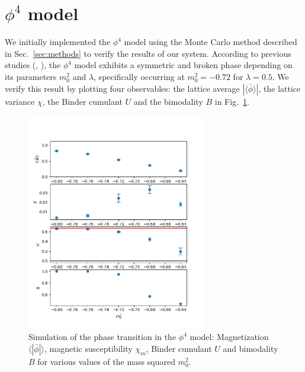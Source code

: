 \documentclass[12pt]{report}
\begin{document}
\section{$\phi^4$ model}

We initially implemented the $\phi^4$ model using the Monte Carlo method described in Sec.~\ref{sec:methods} to verify the results of our system. According to previous studies (\cite{monahan2016}, \cite{schaich2006}), the $\phi^4$ model exhibits a symmetric and broken phase depending on its parameters $m_0^2$ and $\lambda$, specifically occurring at $m_0^2 = -0.72$ for $\lambda = 0.5$. We verify this result by plotting four observables: the lattice average $|\langle\bar\phi\rangle|$, the lattice variance $\chi$, the Binder cumulant $U$ and the bimodality $B$ in Fig.~\ref{fig:phi4}.
\begin{figure}[h]
    \centering
      \includegraphics[width=0.7\textwidth]{imgs/phi4.png}
      \caption{\label{fig:phi4} Simulation of the phase transition in the $\phi^4$ model: Magnetization $\langle |\bar\phi|\rangle$, magnetic susceptibility $\chi_m$, Binder cumulant $U$ and bimodality $B$ for various values of the mass squared $m_0^2$.}
\end{figure}
\end{document}
